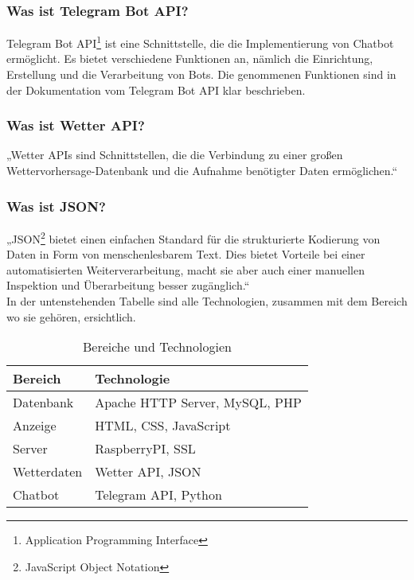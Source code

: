 \subsubsection{Was ist Telegram Bot API?} 
Telegram Bot API\footnote{Application Programming Interface} ist eine Schnittstelle, die die Implementierung von Chatbot ermöglicht. Es bietet verschiedene Funktionen an, nämlich die Einrichtung, Erstellung und die Verarbeitung von Bots. Die genommenen Funktionen sind in der Dokumentation vom Telegram Bot API klar beschrieben. \cite{50_telegram}  
\subsubsection{Was ist Wetter API?} 
„Wetter APIs sind Schnittstellen, die die Verbindung zu einer großen Wettervorhersage-Datenbank und die Aufnahme benötigter Daten ermöglichen.“ \cite{50_Wetter}
\subsubsection{Was ist JSON?} 
„JSON\footnote{JavaScript Object Notation} bietet einen einfachen Standard für die strukturierte Kodierung von Daten in Form von menschenlesbarem Text. Dies bietet Vorteile bei einer automatisierten Weiterverarbeitung, macht sie aber auch einer manuellen Inspektion und Überarbeitung besser zugänglich.“ \cite{50_json}
\\
In der untenstehenden Tabelle sind alle Technologien, zusammen mit dem Bereich wo sie gehören, ersichtlich. 
\begin{table}[h]
	\begin{center}
		
		\label{tab:Tabelle2}
	
			\begin{tabular}{ | l |l |} 
				\hline
				\textbf{Bereich} & \textbf{Technologie}\\ \hline 
				Datenbank &	Apache HTTP Server, MySQL, PHP \\ \hline
				Anzeige &	HTML, CSS, JavaScript \\ \hline
				Server &	RaspberryPI, SSL \\ \hline
				Wetterdaten	 &Wetter API, JSON \\ \hline
				Chatbot &	Telegram API, Python \\ \hline
				
				\hline
				 
		
		\end{tabular} 
		\caption{Bereiche und Technologien}
	\end{center}
\end{table} 
